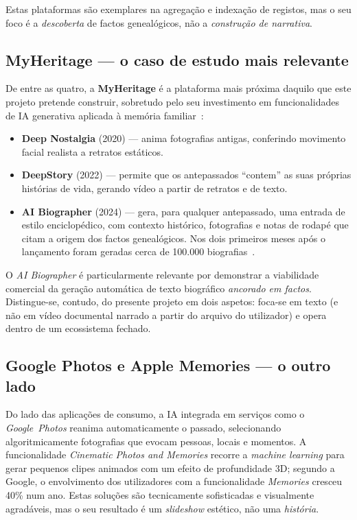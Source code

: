 Estas plataformas são exemplares na agregação e indexação de registos,
mas o seu foco é a \emph{descoberta} de factos genealógicos, não a
\emph{construção de narrativa}.

\subsection{MyHeritage — o caso de estudo mais relevante}
\label{sub:myheritage}

De entre as quatro, a \textbf{MyHeritage} é a plataforma mais próxima
daquilo que este projeto pretende construir, sobretudo pelo seu
investimento em funcionalidades de IA generativa aplicada à memória
familiar~\cite{myheritage_rootstech}:

\begin{itemize}[leftmargin=*]
  \item \textbf{Deep Nostalgia} (2020) — anima fotografias antigas,
  conferindo movimento facial realista a retratos estáticos.
  \item \textbf{DeepStory} (2022) — permite que os antepassados
  ``contem'' as suas próprias histórias de vida, gerando vídeo a partir
  de retratos e de texto.
  \item \textbf{AI Biographer} (2024) — gera, para qualquer antepassado,
  uma entrada de estilo enciclopédico, com contexto histórico,
  fotografias e notas de rodapé que citam a origem dos factos
  genealógicos. Nos dois primeiros meses após o lançamento foram geradas
  cerca de 100.000 biografias~\cite{myheritage_rootstech}.
\end{itemize}

O \emph{AI Biographer} é particularmente relevante por demonstrar a
viabilidade comercial da geração automática de texto biográfico
\emph{ancorado em factos}. Distingue-se, contudo, do presente projeto em
dois aspetos: foca-se em texto (e não em vídeo documental narrado a
partir do arquivo do utilizador) e opera dentro de um ecossistema fechado.

\subsection{Google Photos e Apple Memories — o outro lado}
\label{sub:googlephotos}

Do lado das aplicações de consumo, a IA integrada em serviços como o
\emph{Google~Photos} reanima automaticamente o passado, selecionando
algoritmicamente fotografias que evocam pessoas, locais e momentos. A
funcionalidade \emph{Cinematic Photos and Memories} recorre a
\emph{machine learning} para gerar pequenos clipes animados com um efeito
de profundidade 3D; segundo a Google, o envolvimento dos utilizadores com
a funcionalidade \emph{Memories} cresceu 40\% num ano. Estas soluções são
tecnicamente sofisticadas e visualmente agradáveis, mas o seu resultado é
um \emph{slideshow} estético, não uma \emph{história}.

